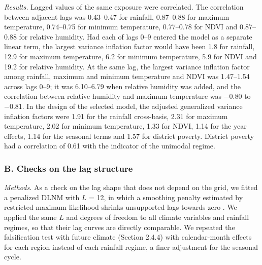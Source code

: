 \documentclass[11pt,a4paper]{article}
\begin{document}
\emph{Results.} Lagged values of the same exposure were correlated. The correlation between adjacent lags was 0.43--0.47 for rainfall, 0.87--0.88 for maximum temperature, 0.74--0.75 for minimum temperature, 0.77--0.78 for NDVI and 0.87--0.88 for relative humidity. Had each of lags 0--9 entered the model as a separate linear term, the largest variance inflation factor would have been 1.8 for rainfall, 12.9 for maximum temperature, 6.2 for minimum temperature, 5.9 for NDVI and 19.2 for relative humidity. At the same lag, the largest variance inflation factor among rainfall, maximum and minimum temperature and NDVI was 1.47--1.54 across lags 0--9; it was 6.10--6.79 when relative humidity was added, and the correlation between relative humidity and maximum temperature was −0.80 to −0.81. In the design of the selected model, the adjusted generalized variance inflation factors were 1.91 for the rainfall cross-basis, 2.31 for maximum temperature, 2.02 for minimum temperature, 1.33 for NDVI, 1.14 for the year effects, 1.14 for the seasonal terms and 1.57 for district poverty. District poverty had a correlation of 0.61 with the indicator of the unimodal regime.

\label{s1text-b}

\subsubsection*{B. Checks on the lag structure}

\emph{Methods.} As a check on the lag shape that does not depend on the grid, we fitted a penalized DLNM with \(L\) = 12, in which a smoothing penalty estimated by restricted maximum likelihood shrinks unsupported lags towards zero \cite{ref51}. We applied the same \(L\) and degrees of freedom to all climate variables and rainfall regimes, so that their lag curves are directly comparable. We repeated the falsification test with future climate (Section 2.4.4) with calendar-month effects for each region instead of each rainfall regime, a finer adjustment for the seasonal cycle.
\end{document}
